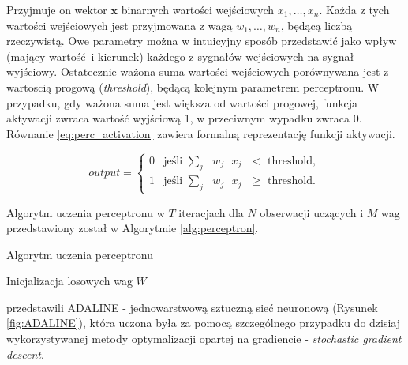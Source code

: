 \documentclass[12pt,a4paper,twoside]{article}
\begin{document}
Przyjmuje on wektor \(\mathbf{x}\) binarnych wartości wejściowych \(x_1, \ldots, x_n \). Każda z tych wartości wejściowych jest przyjmowana z wagą \(w_1, \ldots, w_n \), będącą liczbą rzeczywistą. Owe parametry można w intuicyjny sposób przedstawić jako wpływ (mający wartość i kierunek) każdego z sygnałów wejściowych na sygnał wyjściowy. Ostatecznie ważona suma wartości wejściowych porównywana jest z wartoscią progową (\textit{threshold}), będącą kolejnym parametrem perceptronu. W przypadku, gdy ważona suma jest większa od wartości progowej, funkcja aktywacji zwraca wartość wyjściową 1, w przeciwnym wypadku zwraca 0. Równanie \ref{eq:perc_activation} zawiera formalną reprezentację funkcji aktywacji.

\begin{equation} \label{eq:perc_activation}
  output=\begin{cases}
    0& \text{jeśli $\sum_j$ $w_j$ $x_j$ $<$ threshold},\\
    1& \text{jeśli $\sum_j$ $w_j$ $x_j$ $\geq$ threshold}.
  \end{cases}
\end{equation}

Algorytm uczenia perceptronu w $T$ iteracjach dla $N$ obserwacji uczących i $M$ wag przedstawiony został w Algorytmie \ref{alg:perceptron}.

\begin{algorithm}
\caption{Algorytm uczenia perceptronu}\label{alg:perceptron}
  \begin{algorithmic}[1]
    \State Inicjalizacja losowych wag $W$
        \EndFor
      \EndFor
    \EndFor
  \end{algorithmic}
\end{algorithm}

\citet{widrow1960} przedstawili ADALINE - jednowarstwową sztuczną sieć neuronową (Rysunek \ref{fig:ADALINE}), która uczona była za pomocą szczególnego przypadku do dzisiaj wykorzystywanej metody optymalizacji opartej na gradiencie - \textit{stochastic gradient descent}.
\end{document}
